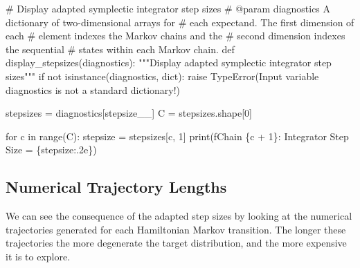 \documentclass[
  letterpaper,
  DIV=11,
  numbers=noendperiod]{scrartcl}
\newenvironment{Shaded}{\begin{snugshade}}{\end{snugshade}}
\newcommand{\BuiltInTok}[1]{\textcolor[rgb]{0.00,0.23,0.31}{#1}}
\newcommand{\CommentTok}[1]{\textcolor[rgb]{0.37,0.37,0.37}{#1}}
\newcommand{\ControlFlowTok}[1]{\textcolor[rgb]{0.00,0.23,0.31}{#1}}
\newcommand{\DecValTok}[1]{\textcolor[rgb]{0.68,0.00,0.00}{#1}}
\newcommand{\KeywordTok}[1]{\textcolor[rgb]{0.00,0.23,0.31}{#1}}
\newcommand{\NormalTok}[1]{\textcolor[rgb]{0.00,0.23,0.31}{#1}}
\newcommand{\OperatorTok}[1]{\textcolor[rgb]{0.37,0.37,0.37}{#1}}
\newcommand{\PreprocessorTok}[1]{\textcolor[rgb]{0.68,0.00,0.00}{#1}}
\newcommand{\SpecialCharTok}[1]{\textcolor[rgb]{0.37,0.37,0.37}{#1}}
\newcommand{\SpecialStringTok}[1]{\textcolor[rgb]{0.13,0.47,0.30}{#1}}
\newcommand{\StringTok}[1]{\textcolor[rgb]{0.13,0.47,0.30}{#1}}
\begin{document}
\begin{Shaded}
\begin{Highlighting}[]
\CommentTok{\# Display adapted symplectic integrator step sizes}
\CommentTok{\# @param diagnostics A dictionary of two{-}dimensional arrays for}
\CommentTok{\#                    each expectand.  The first dimension of each}
\CommentTok{\#                    element indexes the Markov chains and the}
\CommentTok{\#                    second dimension indexes the sequential}
\CommentTok{\#                    states within each Markov chain.}
\KeywordTok{def}\NormalTok{ display\_stepsizes(diagnostics):}
  \CommentTok{"""Display adapted symplectic integrator step sizes"""}
  \ControlFlowTok{if} \KeywordTok{not} \BuiltInTok{isinstance}\NormalTok{(diagnostics, }\BuiltInTok{dict}\NormalTok{):}
    \ControlFlowTok{raise} \PreprocessorTok{TypeError}\NormalTok{(}\StringTok{\textquotesingle{}Input variable \textasciigrave{}diagnostics\textasciigrave{} is not a standard dictionary!\textquotesingle{}}\NormalTok{)}
  
\NormalTok{  stepsizes }\OperatorTok{=}\NormalTok{ diagnostics[}\StringTok{\textquotesingle{}stepsize\_\_\textquotesingle{}}\NormalTok{]}
\NormalTok{  C }\OperatorTok{=}\NormalTok{ stepsizes.shape[}\DecValTok{0}\NormalTok{]}
  
  \ControlFlowTok{for}\NormalTok{ c }\KeywordTok{in} \BuiltInTok{range}\NormalTok{(C):}
\NormalTok{    stepsize }\OperatorTok{=}\NormalTok{ stepsizes[c, }\DecValTok{1}\NormalTok{]}
    \BuiltInTok{print}\NormalTok{(}\SpecialStringTok{f\textquotesingle{}Chain }\SpecialCharTok{\{}\NormalTok{c }\OperatorTok{+} \DecValTok{1}\SpecialCharTok{\}}\SpecialStringTok{: Integrator Step Size = }\SpecialCharTok{\{}\NormalTok{stepsize}\SpecialCharTok{:.2e\}}\SpecialStringTok{\textquotesingle{}}\NormalTok{)}
\end{Highlighting}
\end{Shaded}

\subsection{Numerical Trajectory
Lengths}\label{numerical-trajectory-lengths}

We can see the consequence of the adapted step sizes by looking at the
numerical trajectories generated for each Hamiltonian Markov transition.
The longer these trajectories the more degenerate the target
distribution, and the more expensive it is to explore.
\end{document}
